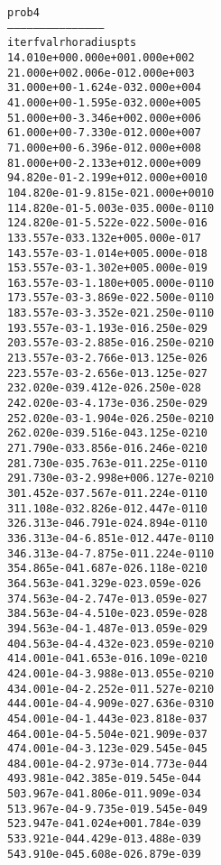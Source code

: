 \begin{alltt}
prob4
---------------------------------------------
iter        fval         rho      radius  pts
   1   4.010e+00   0.000e+00   1.000e+00    2
   2   1.000e+00   2.006e-01   2.000e+00    3
   3   1.000e+00  -1.624e-03   2.000e+00    4
   4   1.000e+00  -1.595e-03   2.000e+00    5
   5   1.000e+00  -3.346e+00   2.000e+00    6
   6   1.000e+00  -7.330e-01   2.000e+00    7
   7   1.000e+00  -6.396e-01   2.000e+00    8
   8   1.000e+00  -2.133e+01   2.000e+00    9
   9   4.820e-01  -2.199e+01   2.000e+00   10
  10   4.820e-01  -9.815e-02   1.000e+00   10
  11   4.820e-01  -5.003e-03   5.000e-01   10
  12   4.820e-01  -5.522e-02   2.500e-01    6
  13   3.557e-03   3.132e+00   5.000e-01    7
  14   3.557e-03  -1.014e+00   5.000e-01    8
  15   3.557e-03  -1.302e+00   5.000e-01    9
  16   3.557e-03  -1.180e+00   5.000e-01   10
  17   3.557e-03  -3.869e-02   2.500e-01   10
  18   3.557e-03  -3.352e-02   1.250e-01   10
  19   3.557e-03  -1.193e-01   6.250e-02    9
  20   3.557e-03  -2.885e-01   6.250e-02   10
  21   3.557e-03  -2.766e-01   3.125e-02    6
  22   3.557e-03  -2.656e-01   3.125e-02    7
  23   2.020e-03   9.412e-02   6.250e-02    8
  24   2.020e-03  -4.173e-03   6.250e-02    9
  25   2.020e-03  -1.904e-02   6.250e-02   10
  26   2.020e-03   9.516e-04   3.125e-02   10
  27   1.790e-03   3.856e-01   6.246e-02   10
  28   1.730e-03   5.763e-01   1.225e-01   10
  29   1.730e-03  -2.998e+00   6.127e-02   10
  30   1.452e-03   7.567e-01   1.224e-01   10
  31   1.108e-03   2.826e-01   2.447e-01   10
  32   6.313e-04   6.791e-02   4.894e-01   10
  33   6.313e-04  -6.851e-01   2.447e-01   10
  34   6.313e-04  -7.875e-01   1.224e-01   10
  35   4.865e-04   1.687e-02   6.118e-02   10
  36   4.563e-04   1.329e-02   3.059e-02    6
  37   4.563e-04  -2.747e-01   3.059e-02    7
  38   4.563e-04  -4.510e-02   3.059e-02    8
  39   4.563e-04  -1.487e-01   3.059e-02    9
  40   4.563e-04  -4.432e-02   3.059e-02   10
  41   4.001e-04   1.653e-01   6.109e-02   10
  42   4.001e-04  -3.988e-01   3.055e-02   10
  43   4.001e-04  -2.252e-01   1.527e-02   10
  44   4.001e-04  -4.909e-02   7.636e-03   10
  45   4.001e-04  -1.443e-02   3.818e-03    7
  46   4.001e-04  -5.504e-02   1.909e-03    7
  47   4.001e-04  -3.123e-02   9.545e-04    5
  48   4.001e-04  -2.973e-01   4.773e-04    4
  49   3.981e-04   2.385e-01   9.545e-04    4
  50   3.967e-04   1.806e-01   1.909e-03    4
  51   3.967e-04  -9.735e-01   9.545e-04    9
  52   3.947e-04   1.024e+00   1.784e-03    9
  53   3.921e-04   4.429e-01   3.488e-03    9
  54   3.910e-04   5.608e-02   6.879e-03    9

\end{alltt}
